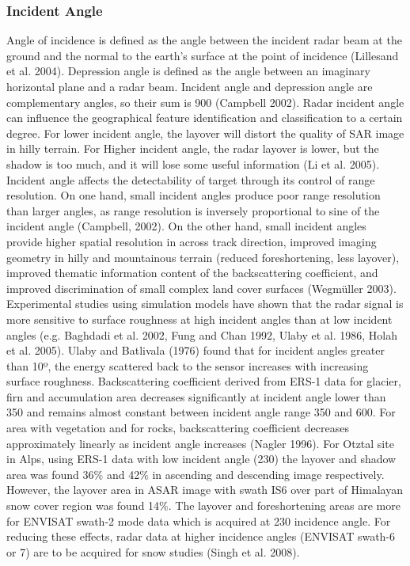 \subsubsection*{Incident Angle}
Angle of incidence is defined as the angle between the incident radar beam at the ground and the normal to the earth’s surface at the point of incidence (Lillesand et al. 2004). Depression angle is defined as the angle between an imaginary horizontal plane and a radar beam. Incident angle and depression angle are complementary angles, so their sum is 900 (Campbell 2002). Radar incident angle can influence the geographical feature identification and classification to a certain degree. For lower incident angle, the layover will distort the quality of SAR image in hilly terrain. For Higher incident angle, the radar layover is lower, but the shadow is too much, and it will lose some useful information (Li et al. 2005). Incident angle affects the detectability of target through its control of range resolution. On one hand, small incident angles produce poor range resolution than larger angles, as range resolution is inversely proportional to sine of the incident angle (Campbell, 2002). On the other hand, small incident angles provide higher spatial resolution in across track direction, improved imaging geometry in hilly and mountainous terrain (reduced foreshortening, less layover), improved thematic information content of the backscattering coefficient, and improved discrimination of small complex land cover surfaces (Wegmüller 2003). Experimental studies using simulation models have shown that the radar signal is more sensitive to surface roughness at high incident angles than at low incident angles (e.g. Baghdadi et al. 2002, Fung and Chan 1992, Ulaby et al. 1986, Holah et al. 2005). Ulaby and Batlivala (1976) found that for incident angles greater than 10º, the energy scattered back to the sensor increases with increasing surface roughness. Backscattering coefficient derived from ERS-1 data for glacier, firn and accumulation area decreases significantly at incident angle lower than 350 and remains almost constant between incident angle range 350 and 600. For area with vegetation and for rocks, backscattering coefficient decreases approximately linearly as incident angle increases (Nagler 1996). For Otztal site in Alps, using ERS-1 data with low incident angle (230) the layover and shadow area was found 36$\%$ and 42$\%$ in ascending and descending image respectively. However, the layover area in ASAR image with swath IS6 over part of Himalayan snow cover region was found 14$\%$. The layover and foreshortening areas are more for ENVISAT swath-2 mode data which is acquired at 230 incidence angle. For reducing these effects, radar data at higher incidence angles (ENVISAT swath-6 or 7) are to be acquired for snow studies (Singh et al. 2008). 

